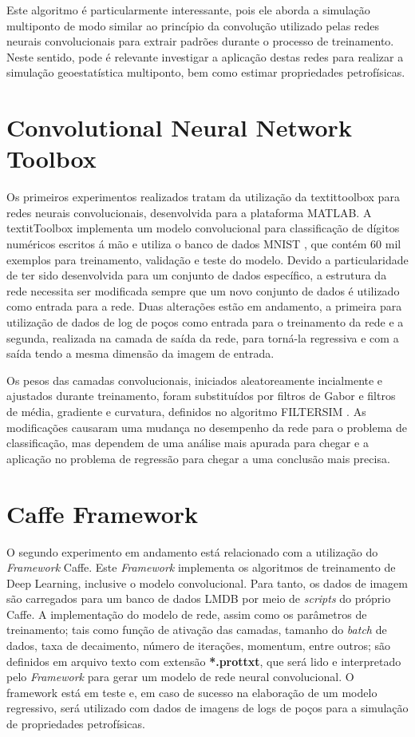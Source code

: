 \documentclass[11pt]{article}
\begin{document}
Este algoritmo é particularmente interessante, pois ele aborda a simulação multiponto de modo similar ao princípio da convolução utilizado pelas redes neurais
convolucionais para extrair padrões durante o processo de treinamento.
Neste sentido, pode é relevante investigar a aplicação destas redes para realizar a simulação geoestatística multiponto,
bem como estimar propriedades petrofísicas.

\section{Convolutional Neural Network Toolbox}
Os primeiros experimentos realizados tratam da utilização da textit{toolbox} para redes neurais convolucionais, desenvolvida para a plataforma MATLAB.
A textit{Toolbox} implementa um modelo convolucional para classificação de dígitos numéricos escritos á mão e utiliza o banco de dados 
MNIST \cite{LeCun98}, que contém 60 mil exemplos para treinamento, validação e teste do modelo. Devido a particularidade de ter sido desenvolvida para um conjunto de dados específico,
a estrutura da rede necessita ser modificada sempre que um novo conjunto de dados é utilizado como entrada para a rede.
Duas alterações estão em andamento, a primeira para utilização de dados de log de poços como
entrada para o treinamento da rede e a segunda, realizada na camada de saída da rede, para torná-la regressiva e com a saída tendo a
mesma dimensão da imagem de entrada.

Os pesos das camadas convolucionais, iniciados aleatoreamente incialmente e ajustados durante treinamento, foram substituídos por filtros de Gabor
e filtros de média, gradiente e curvatura, definidos no algoritmo FILTERSIM \cite{Wu2008}. As modificações causaram uma mudança no desempenho da
rede para o problema de classificação, mas dependem de uma análise mais apurada para chegar e a aplicação no problema de regressão para chegar a
uma conclusão mais precisa.

\section{Caffe Framework}
O segundo experimento em andamento está relacionado com a utilização do \textit{Framework} Caffe. Este \textit{Framework} implementa os 
algoritmos de treinamento de Deep Learning, inclusive o modelo convolucional. Para tanto, os dados de imagem são carregados para um
banco de dados LMDB por meio de \textit{scripts} do próprio Caffe. A implementação do modelo de rede, assim como os parâmetros de treinamento;
tais como função de ativação das camadas, tamanho do \textit{batch} de dados, taxa de decaimento, número de iterações, momentum, entre outros;
são definidos em arquivo texto com extensão \textbf{*.prottxt}, que será lido e interpretado pelo \textit{Framework} para gerar um modelo de
rede neural convolucional. O framework está em teste e, em caso de sucesso na elaboração de um modelo regressivo, será utilizado com dados de imagens de logs de poços para
a simulação de propriedades petrofísicas.
\end{document}
